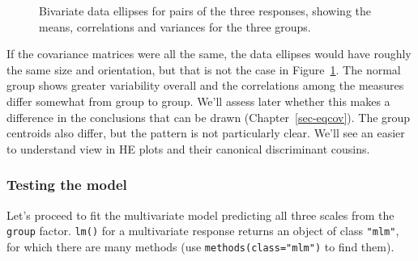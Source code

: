 \documentclass[
  letterpaper,
  10pt,
  krantz2]{krantz}
\begin{document}
\begin{figure}[H]


\caption{\label{fig-parenting-covEllipses}Bivariate data ellipses for
pairs of the three responses, showing the means, correlations and
variances for the three groups.}

\end{figure}%

If the covariance matrices were all the same, the data ellipses would
have roughly the same size and orientation, but that is not the case in
Figure~\ref{fig-parenting-covEllipses}. The normal group shows greater
variability overall and the correlations among the measures differ
somewhat from group to group. We'll assess later whether this makes a
difference in the conclusions that can be drawn
(Chapter~\ref{sec-eqcov}). The group centroids also differ, but the
pattern is not particularly clear. We'll see an easier to understand
view in HE plots and their canonical discriminant cousins.

\subsubsection{Testing the model}\label{testing-the-model}

Let's proceed to fit the multivariate model predicting all three scales
from the \texttt{group} factor. \texttt{lm()} for a multivariate
response returns an object of class \texttt{"mlm"}, for which there are
many methods (use \texttt{methods(class="mlm")} to find them).
\end{document}
